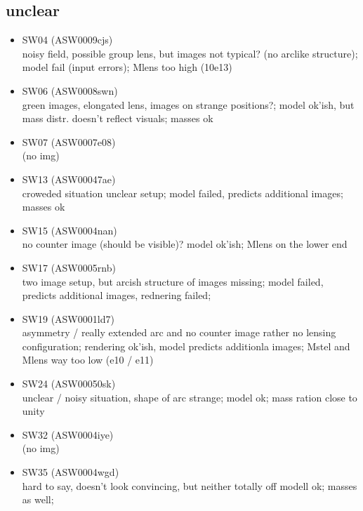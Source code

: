 \documentclass[a4paper,fleqn,usenatbib]{mnras}
\begin{document}
\subsection{unclear}
\begin{itemize}
  \item SW04 (ASW0009cjs) \\
  noisy field, possible group lens, but images not typical? (no arclike structure);
  model fail (input errors);
  Mlens too high (10e13)
  
  \item SW06 (ASW0008swn)\\
  green images, elongated lens, images on strange positions?;
  model ok'ish, but mass distr. doesn't reflect visuals;
  masses ok
  
  \item SW07 (ASW0007e08) \\
  (no img)
  
  \item SW13 (ASW00047ae) \\
  croweded situation unclear setup;
  model failed, predicts additional images;
  masses ok
  
  \item SW15 (ASW0004nan) \\
  no counter image (should be visible)?
  model ok'ish;
  Mlens on the lower end
  
  \item SW17 (ASW0005rnb) \\
  two image setup, but arcish structure of images missing;
  model failed, predicts additional images, rednering failed;
  
  \item SW19 (ASW0001ld7) \\
  asymmetry / really extended arc and no counter image rather no lensing configuration;
  rendering ok'ish, model predicts additionla images;
  Mstel and Mlens way too low (e10 / e11)
  
  \item SW24 (ASW00050sk) \\
  unclear / noisy situation, shape of arc strange;
  model ok;
  mass ration close to unity
  
  \item SW32 (ASW0004iye) \\
  (no img)
  
  \item SW35 (ASW0004wgd) \\
  hard to say, doesn't look convincing, but neither totally off
  modell ok;
  masses as well;
  

\end{itemize}
\end{document}
